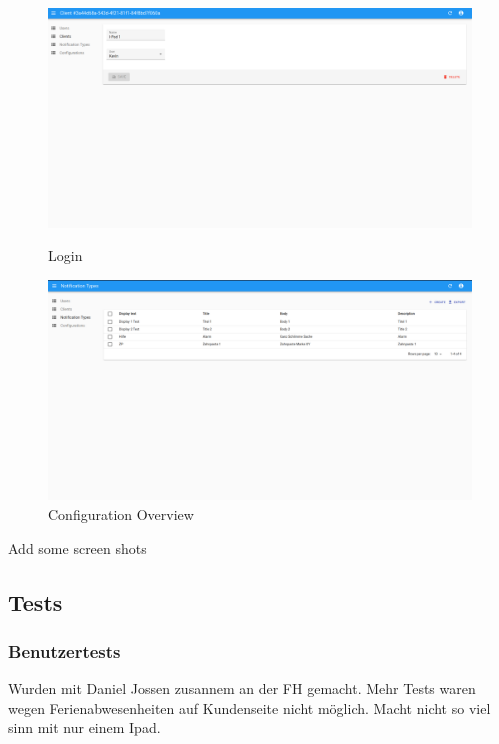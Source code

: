 \begin{figure}[h]
    \centering
    \begin{minipage}[b]{0.4\textwidth}
        \includegraphics[width=\textwidth]{graphics/screenshots/adminui/configuration}
        \caption{Login}
    \end{minipage}
    \hfill
    \begin{minipage}[b]{0.4\textwidth}
        \includegraphics[width=\textwidth]{graphics/screenshots/adminui/notification-type}
        \caption{Configuration Overview}
    \end{minipage}
    \label{fig:AdminUI-Screens2}
\end{figure}




Add some screen shots

\subsection{Tests}

\subsubsection*{Benutzertests}
Wurden mit Daniel Jossen zusannem an der FH gemacht.
Mehr Tests waren wegen Ferienabwesenheiten auf Kundenseite nicht möglich.
Macht nicht so viel sinn mit nur einem Ipad.


